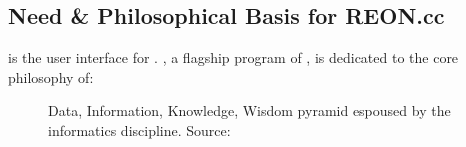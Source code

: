 \documentclass[letterpaper,10pt,english]{sphinxmanual}
\begin{document}
\subsection{Need \& Philosophical Basis for REON.cc}
\label{\detokenize{requirements/introduction/need:need-philosophical-basis-for-reon-cc}}\label{\detokenize{requirements/introduction/need::doc}}
\sphinxAtStartPar
{\hyperref[\detokenize{glossary:term-REON.cc}]{}} is the user interface for {\hyperref[\detokenize{glossary:term-REON}]{}}. {\hyperref[\detokenize{glossary:term-REON}]{}}, a flagship program of {\hyperref[\detokenize{glossary:term-RATES}]{}}, is dedicated to the core philosophy of:

\sphinxAtStartPar
{}

\begin{figure}[htbp]
\centering
\capstart

\noindent{}
\caption{Data, Information, Knowledge, Wisdom pyramid espoused by the informatics discipline. Source: }\label{\detokenize{requirements/introduction/need:id1}}\end{figure}
\end{document}
